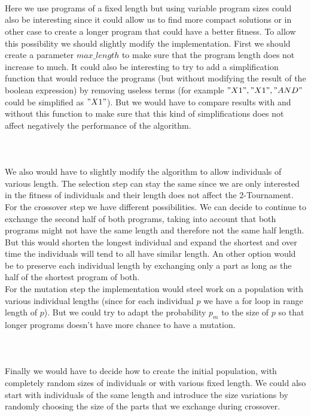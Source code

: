 \documentclass[14pt]
{article}
\begin{document}
\paragraph*{\\}
Here we use programs of a fixed length but using variable program sizes could also be interesting since it could allow us to find more compact solutions or in other case to create a longer program that could have a better fitness. To allow this possibility we should slightly modify the implementation. First we should create a parameter $max\_length$ to make sure that the program length does not increase to much. It could also be interesting to try to add a simplification function that would reduce the programs (but without modifying the result of the boolean expression) by removing useless terms (for example $"X1", "X1", "AND"$ could be simplified as $"X1"$). But we would have to compare results with and without this function to make sure that this kind of simplifications does not affect negatively the performance of the algorithm.

\paragraph*{\\}We also would have to slightly modify the algorithm to allow individuals of various length. The selection step can stay the same since we are only interested in the fitness of individuals and their length does not affect the 2-Tournament.\\
For the crossover step we have different possibilities. We can decide to continue to exchange the second half of both programs, taking into account that both programs might not have the same length and therefore not the same half length. But this would shorten the longest individual and expand the shortest and over time the individuals will tend to all have similar length. An other option would be to preserve each individual length by exchanging only a part as long as the half of the shortest program of both.\\
For the mutation step the implementation would steel work on a population with various individual lengths (since for each individual $p$ we have a for loop in range length of $p$). But we could try to adapt the probability $p_m$ to the size of $p$ so that longer programs doesn't have more chance to have a mutation.

\paragraph*{\\} Finally we would have to decide how to create the initial population, with completely random sizes of individuals or with various fixed length. We could also start with individuals of the same length and introduce the size variations by randomly choosing the size of the parts that we exchange during crossover.
\end{document}

